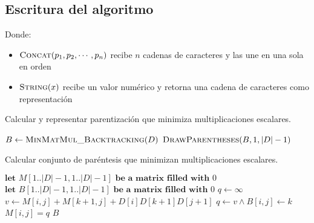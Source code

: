 \documentclass[letter]{article}
\begin{document}
\subsection{Escritura del algoritmo} \label{algoritmo:escritura}

Donde:

\begin{itemize}
    \item $\Call{Concat}{p_1, p_2, \cdots, p_n}$ recibe $n$ cadenas de caracteres y las une en una sola en orden
    \item $\Call{String}{x}$ recibe un valor numérico y retorna una cadena de caracteres como representación
\end{itemize}

\begin{algorithm}[!ht]
\caption{Calcular y representar parentización que minimiza multiplicaciones escalares.}
\begin{algorithmic}[1] 
    \State $B \leftarrow \Call{MinMatMul\_Backtracking}{D}$
    \State \Return $\Call{DrawParentheses}{B, 1, |D| - 1}$
\EndProcedure
\end{algorithmic}
\end{algorithm}

\begin{algorithm}[!ht]
\caption{Calcular conjunto de paréntesis que minimizan multiplicaciones escalares.}
\begin{algorithmic}[1] 
    \State $\textbf{let } M[ 1..|D|-1, 1..|D|-1  ] \textbf{ be a matrix filled with } 0$
    \State $\textbf{let } B[ 1..|D|-1, 1..|D|-1  ] \textbf{ be a matrix filled with } 0$
            \State $q \leftarrow \infty$
                \State $v \leftarrow M[i,j] + M[k + 1, j] + D[i] D[k + 1] D[j + 1]$
                    \State $q \leftarrow v \land B[i,j] \leftarrow k$
                \EndIf
            \EndFor
            \State $M[i,j] = q$
        \EndFor
    \EndFor
    \State \Return $B$
\EndProcedure
\end{algorithmic}
\end{algorithm}
\end{document}
